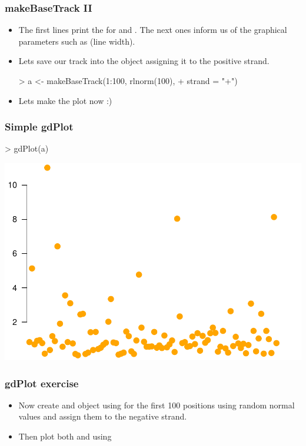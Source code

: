 \begin{frame}
  \frametitle{makeBaseTrack II}
  \begin{itemize}
  \item The first lines print the  for  and . The next ones inform us of the graphical parameters such as  (line width).
  \item Lets save our track into the object  assigning it to the positive strand.
\begin{Schunk}
\begin{Sinput}
> a <- makeBaseTrack(1:100, rlnorm(100), 
+     strand = "+")
\end{Sinput}
\end{Schunk}
  \item Lets make the plot now :)
  \end{itemize}
\end{frame}

\begin{frame}
  \frametitle{Simple gdPlot}
\begin{Schunk}
\begin{Sinput}
> gdPlot(a)
\end{Sinput}
\end{Schunk}
\includegraphics{plots/fig-010}
\end{frame}

\begin{frame}
  \frametitle{gdPlot exercise}
  \begin{itemize}
  \item Now create and object  using  for the first 100 positions using random normal values and assign them to the negative strand.
  \item Then plot both  and  using 
  \end{itemize}
\end{frame}

